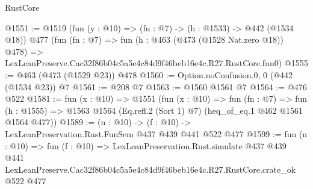 \begin{lexlean}{RustCore}
\begin{coremodule}
@1551 := @1519
    (fun (y : @10) => (fn : @7) -> (h : @1533) -> @442 (@1534 @18))
    @477
    (fun (fn : @7) =>
    fun (h : @463 (@473 (@1528 Nat.zero @18)) @478) =>
    LexLeanPreserve.Cac32f86b04c5a5e4c84d9f46beb16e4c.R27.RustCore.fun0)
@1555 := @463 (@473 (@1529 @23)) @478
@1560 := Option.noConfusion.{0, 0} (@442 (@1534 @23)) @7
@1561 := @208 @7
@1563 := @1560 @1561 @7
@1564 := @476 @522
@1581 := fun (x : @10) =>
  @1551
    (fun (x : @10) =>
    fun (fn : @7) =>
    fun (h : @1555) => @1563 @1564 (Eq.refl.{2} (Sort 1) @7) (heq_of_eq.{1} @462 @1561 @1564 @477))
@1589 := (n : @10) -> (f : @10) -> LexLeanPreservation.Rust.FunSem @437 @439 @441 @522 @477
@1599 := fun (n : @10) =>
  fun (f : @10) =>
  LexLeanPreservation.Rust.simulate
    @437
    @439
    @441
    LexLeanPreserve.Cac32f86b04c5a5e4c84d9f46beb16e4c.R27.RustCore.crate_ok
    @522
    @477
\end{coremodule}
\end{lexlean}

